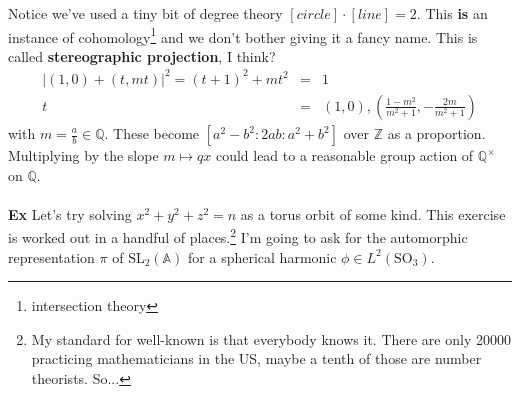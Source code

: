 \documentclass[12pt]{article}
\begin{document}
Notice we've used a tiny bit of degree theory $[circle]\cdot[line]=2 $.  This \textbf{is} an instance of cohomology\footnote{intersection theory} and we don't bother giving it a fancy name.  This is called \textbf{stereographic projection}, I think? 
\begin{eqnarray*}\big|(1,0)+ (t, mt) \big|^2 = (t+1)^2 + mt^2 &=& 1 \\
t  &=& (1,0) ,   (\tfrac{1-m^2}{m^2 + 1},- \tfrac{2m}{m^2+1}) \end{eqnarray*}
with $m = \frac{a}{b} \in \mathbb{Q}$.  These become $[a^2 - b^2 :2ab: a^2 + b^2]$ over $\mathbb{Z}$ as a proportion.  Multiplying by the slope $m \mapsto q x$ could lead to a reasonable group action of $\mathbb{Q}^\times$ on $\mathbb{Q}$. \\ \\
\textbf{Ex} Let's try solving $x^2 + y^2 + z^2 = n$ as a torus orbit of some kind.  This exercise is worked out in a handful of places.\footnote{My standard for well-known is that everybody knows it.  There are only 20000 practicing mathematicians in the US, maybe a tenth of those are number theorists.  So... } I'm going to ask for the automorphic representation $\pi$ of $\text{SL}_2(\mathbb{A})$ for a spherical harmonic $\phi \in L^2( \text{SO}_3)$.
\end{document}
